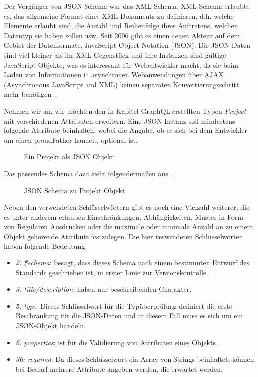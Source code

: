 Der Vorgänger von JSON-Schema war das XML-Schema.
XML-Schema erlaubte es, das allgemeine Format eines XML-Dokuments zu definieren,
d.h. welche Elemente erlaubt sind, die Anzahl und Reihenfolge ihres Auftretens, welchen Datentyp sie haben sollen usw.
Seit 2006 gibt es einen neuen Akteur auf dem Gebiet der Datenformate, JavaScript Object Notation (JSON).
Die JSON Daten sind viel kleiner als ihr XML-Gegenstück und ihre Instanzen sind gültige JavaScript-Objekte, was es interessant für Webentwickler macht, da sie beim Laden von
Informationen in asynchronen Webanwendungen über AJAX (Asynchronous JavaScript and XML) keinen separaten Konvertierungsschritt mehr benötigen~\cite{json-schema-xml}.

Nehmen wir an, wir möchten den in Kapitel GraphQL erstellten Typen \emph{Project}~ mit verschiedenen Attributen erweitern.
Eine JSON Instanz soll mindestens folgende Attribute beinhalten, wobei die Angabe, ob es sich bei dem Entwickler
um einen proudFather handelt, optional ist.

\begin{figure}[h]
    
    \caption{Ein Projekt als JSON Objekt}
    \label{fig:basics:jsonschema:1}
\end{figure}

Das passendes Schema dazu sieht folgendermaßen aus~.

\begin{figure}[hb!]
    
    \caption{JSON Schema zu Projekt Objekt}
    \label{fig:basics:jsonschema:2}
\end{figure}

Neben den verwendeten Schlüsselwörtern gibt es noch eine Vielzahl weiterer, die es unter anderem erlauben Einschränkungen, Abhängigkeiten,
Muster in Form von Regulären Ausdrücken oder die maximale oder minimale Anzahl an zu einem Objekt gehörende Attribute festzulegen.
Die hier verwendeten Schlüsselwörter haben folgende Bedeutung:

\begin{itemize}
    \label{basics:jsonschema:items}
    \setlength\itemsep{-1em}
    \item \emph{2: \$schema}: besagt, dass dieses Schema nach einem bestimmten Entwurf des Standards geschrieben ist, in erster Linie zur Versionskontrolle.
    \item \emph{3: title/description}: haben nur beschreibenden Charakter.
    \item \emph{5: type}: Dieses Schlüsselwort für die Typüberprüfung definiert die erste Beschränkung für die JSON-Daten und in diesem Fall muss es sich um ein JSON-Objekt handeln.
    \item \emph{6: properties}: ist für die Validierung von Attributen eines Objekts.
    \item \emph{36: required}: Da dieses Schlüsselwort ein Array von Strings beinhaltet, können bei Bedarf mehrere Attribute angeben werden, die erwartet werden.
\end{itemize}

